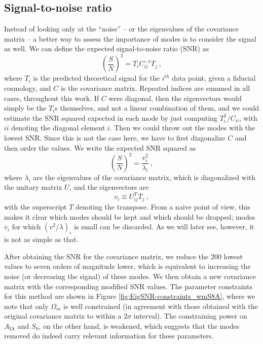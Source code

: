 \documentclass[aps, prd, twocolumn, superscriptaddress, nofootinbib, amssymb, amsmath]{revtex4-2}
\newcommand{\rf}[1]{Figure \ref{fig:#1}}
\newcommand\be{\begin{equation}}
\newcommand\ee{\end{equation}}
\begin{document}
\subsection{Signal-to-noise ratio}\label{subsec:snr}

Instead of looking only at the ``noise'' -- or the eigenvalues of the covariance matrix -- a better way to assess the importance of modes is to consider the signal as well. We can define the expected signal-to-noise ratio (SNR) as
\be
\left(\frac{S}{N}\right)^2 = T_i C^{-1}_{ij} T_j\
,\ee
where $T_i$ is the predicted theoretical signal for the $i^{th}$ data point, given a fiducial cosmology, and $C$ is the covariance matrix. Repeated indices are summed in all cases, throughout this work. If $C$ were diagonal, then the eigenvectors would simply be the $T_i$s themselves, and not a linear combination of them, and we could estimate the SNR squared expected in each mode by just computing $T_i^2/C_{ii}$, with $ii$ denoting the diagonal element $i$. Then we could throw out the modes with the lowest SNR. Since this is not the case here, we have to first diagonalize $C$ and then order the values. We write the expected SNR squared as
\be
\left(\frac{S}{N}\right)^2 = \frac{v_i^2}{\lambda_i}\
,\ee
where $\lambda_i$ are the eigenvalues of the covariance matrix, which is diagonalized with the unitary matrix $U$, and the eigenvectors are 
\be
v_i\equiv U_{ij}^T T_j\
,\ee
with the superscript $T$ denoting the transpose. From a naive point of view, this makes it clear which modes should be kept and which should be dropped; modes $v_i$ for which $\left(v^2/\lambda\right)_i$ is small can be discarded. As we will later see, however, it is not as simple as that.

After obtaining the SNR for the covariance matrix, we reduce the 200 lowest values to seven orders of magnitude lower, which is equivalent to increasing the noise (or decreasing the signal) of these modes. We then obtain a new covariance matrix with the corresponding modified SNR values. The parameter constraints for this method are shown in \rf{EigSNR-constraints_wmS8A}, where we note that only $\Omega_m$ is well constrained (in agreement with those obtained with the original covariance matrix to within a $2\sigma$ interval). The constraining power on $A_{\text{IA}}$ and $S_8$, on the other hand, is weakened, which suggests that the modes removed do indeed carry relevant information for these parameters.
\end{document}
